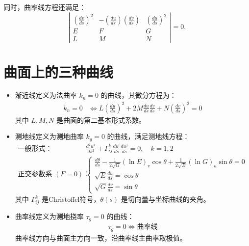 \documentclass[lang=cn,10pt,thmcnt=section]{elegantbook}
\begin{document}
同时，曲率线方程还满足：
\[
\left| \begin{array}{ccc}
\left( \frac{dv}{ds} \right)^2 & - \left( \frac{du}{ds} \right) \left( \frac{dv}{ds} \right)& \left( \frac{du}{ds} \right)^2 \\
E & F & G \\
L & M & N
\end{array} \right| = 0.
\]

\section{曲面上的三种曲线}

\begin{itemize}
    \item 渐近线定义为法曲率 \(k_n = 0\) 的曲线，其微分方程为：
    \begin{align*}
    k_n = 0 &\iff L \left( \frac{du}{ds} \right)^2 + 2M \frac{du}{ds} \frac{dv}{ds} + N \left( \frac{dv}{ds} \right)^2 = 0
    \end{align*}
    其中 \(L, M, N\) 是曲面的第二基本形式系数。

    \item 测地线定义为测地曲率 \(k_g = 0\) 的曲线，满足测地线方程：
    \begin{align*}
    \text{一般形式：} \quad & \frac{d^2 u^k}{ds^2} + \Gamma_{ij}^k \frac{du^i}{ds} \frac{du^j}{ds} = 0, \quad k = 1, 2 \\
    \text{正交参数系 } (F=0)：\quad & 
    \begin{cases}
    \frac{d\theta}{ds} - \frac{1}{2\sqrt{G}} (\ln E)_v \cos\theta + \frac{1}{2\sqrt{E}} (\ln G)_u \sin\theta = 0 \\
    \sqrt{E} \frac{du}{ds} = \cos\theta \\
    \sqrt{G} \frac{dv}{ds} = \sin\theta
    \end{cases}
    \end{align*}
    其中 \(\Gamma_{ij}^k\) 是Christoffel符号，\(\theta(s)\) 是切向量与坐标曲线的夹角。
    
    \item 曲率线定义为测地挠率 \(\tau_g = 0\) 的曲线：
    \begin{align*}
    \tau_g = 0 \iff \text{曲率线}
    \end{align*}
    曲率线方向与曲面主方向一致，沿曲率线主曲率取极值。
    
\end{itemize}
\end{document}
